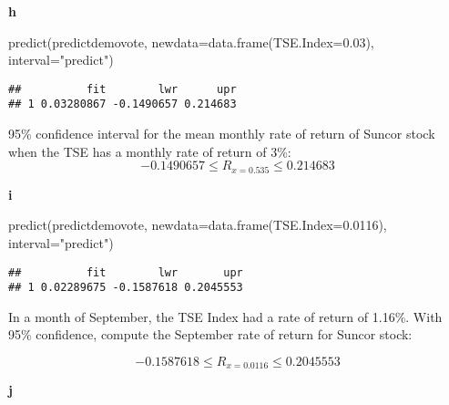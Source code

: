 \documentclass[
]{article}
\newenvironment{Shaded}{\begin{snugshade}}{\end{snugshade}}
\newcommand{\AttributeTok}[1]{\textcolor[rgb]{0.77,0.63,0.00}{#1}}
\newcommand{\FloatTok}[1]{\textcolor[rgb]{0.00,0.00,0.81}{#1}}
\newcommand{\FunctionTok}[1]{\textcolor[rgb]{0.00,0.00,0.00}{#1}}
\newcommand{\NormalTok}[1]{#1}
\newcommand{\StringTok}[1]{\textcolor[rgb]{0.31,0.60,0.02}{#1}}
\begin{document}
\textbf{h}

\begin{Shaded}
\begin{Highlighting}[]
\FunctionTok{predict}\NormalTok{(predictdemovote, }\AttributeTok{newdata=}\FunctionTok{data.frame}\NormalTok{(}\AttributeTok{TSE.Index=}\FloatTok{0.03}\NormalTok{), }\AttributeTok{interval=}\StringTok{"predict"}\NormalTok{)}
\end{Highlighting}
\end{Shaded}

\begin{verbatim}
##          fit        lwr      upr
## 1 0.03280867 -0.1490657 0.214683
\end{verbatim}

95\% confidence interval for the mean monthly rate of return of Suncor
stock when the TSE has a monthly rate of return of 3\%: \[
-0.1490657  \leq R_{x = 0.535} \leq 0.214683
\]

\textbf{i}

\begin{Shaded}
\begin{Highlighting}[]
\FunctionTok{predict}\NormalTok{(predictdemovote, }\AttributeTok{newdata=}\FunctionTok{data.frame}\NormalTok{(}\AttributeTok{TSE.Index=}\FloatTok{0.0116}\NormalTok{), }\AttributeTok{interval=}\StringTok{"predict"}\NormalTok{)}
\end{Highlighting}
\end{Shaded}

\begin{verbatim}
##          fit        lwr       upr
## 1 0.02289675 -0.1587618 0.2045553
\end{verbatim}

In a month of September, the TSE Index had a rate of return of 1.16\%.
With 95\% confidence, compute the September rate of return for Suncor
stock:

\[
-0.1587618   \leq R_{x = 0.0116} \leq 0.2045553
\]

\textbf{j}
\end{document}
